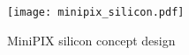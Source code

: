 
%
%

%

\begin{figure}[H]
    \centering
    \texttt{[image: minipix\_silicon.pdf]}
    \caption{MiniPIX silicon concept design}
    \label{fig:minipix_silicon}
\end{figure}

